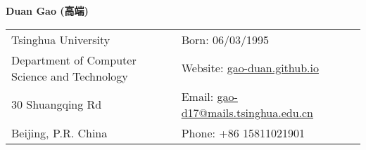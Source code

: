 \documentclass[letterpaper,11pt,oneside]{article}
\begin{document}

\noindent  \LARGE{\textbf{Duan Gao (高端)}}  \\
\vspace{-2ex}
\hrulefill  
\normalsize


\begin{center}
\begin{tabular}{l l l}
 Tsinghua University    &  \hspace{0.5in} Born: 06/03/1995 \\
 
  Department of Computer Science and Technology    & \hspace{0.5in} Website: \href{gao-duan.github.io}{gao-duan.github.io}   \\
   
   30 Shuangqing Rd &  \hspace{0.5in} Email: \href{mailto:gao-d17@mails.tsinghua.edu.cn}{gao-d17@mails.tsinghua.edu.cn} \\
    Beijing, P.R. China  & \hspace{0.5in} Phone: +86 15811021901 \\

\end{tabular}
\end{center}

\vspace{1em}
\end{document}
